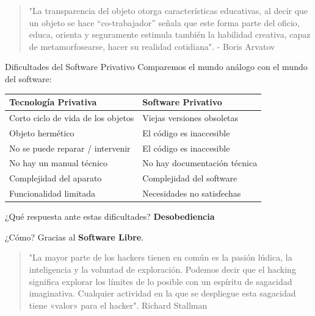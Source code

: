 \documentclass[spanish]{beamer}
\begin{document}
\begin{frame}
    \begin{quote}
        "La transparencia del objeto otorga características educativas, al decir que un objeto se hace “co-trabajador” señala que este forma parte del oficio, educa, orienta y seguramente estimula también la habilidad creativa, capaz de metamorfosearse, hacer su realidad cotidiana". - Boris Arvatov
    \end{quote}
\end{frame}

\begin{frame}{Dificultades del Software Privativo}
    \centering
    Comparemos el mundo análogo con el mundo del software:
    \vspace{0.6cm}

    \resizebox{11cm}{!}
    {
    \begin{tabular}{|l|l|}
        \hline        
        \rowcolor{lightgray}\textbf{Tecnología Privativa} & \textbf{Software Privativo} \\ 
        \hline
        \hline
        Corto ciclo de vida de los objetos & Viejas versiones obsoletas \\ 
        \hline
        Objeto hermético & El código es inaccesible \\
        \hline
        No se puede reparar / intervenir & El código es inaccesible \\
        \hline
        No hay un manual técnico & No hay documentación técnica \\
        \hline
        Complejidad del aparato & Complejidad del software \\
        \hline
        Funcionalidad limitada & Necesidades no satisfechas \\
        \hline
    \end{tabular}
    }
    
    \vspace{0.6cm}

    ¿Qué respuesta ante estas dificultades? \MVRightArrow{} \textbf{Desobediencia}
    
    ¿Cómo? Gracias al \textbf{Software Libre}.
\end{frame}

\begin{frame}
    \begin{quote}
        "La mayor parte de los hackers tienen en común es la pasión lúdica, la inteligencia y la voluntad de exploración. Podemos decir que el hacking significa explorar los límites de lo posible con un espíritu de sagacidad imaginativa. Cualquier actividad en la que se despliegue esta sagacidad tiene «valor» para el hacker". Richard Stallman
    \end{quote}
\end{frame}
\end{document}
